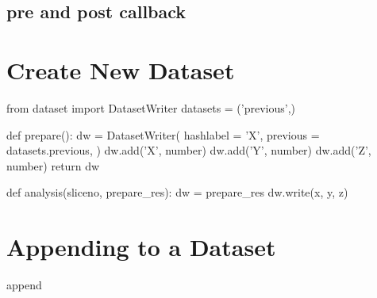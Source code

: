 \subsection{pre and post callback}

\section{Create New Dataset}
\begin{python}
from dataset import DatasetWriter
datasets = ('previous',)

def prepare():
  dw = DatasetWriter(
    hashlabel = 'X',
    previous = datasets.previous,
  )
  dw.add('X', number)
  dw.add('Y', number)
  dw.add('Z', number)
  return dw

def analysis(sliceno, prepare_res):
  dw = prepare_res
  dw.write(x, y, z)
\end{python}

\section{Appending to a Dataset}
append


  
